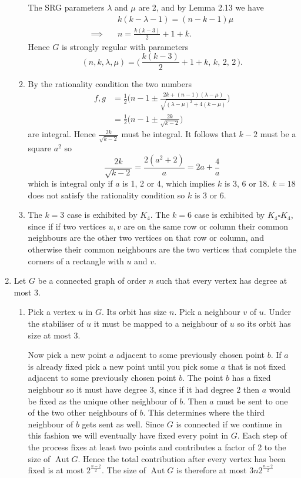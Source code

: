 \documentclass[a4paper, 12pt]{article}
\DeclareMathOperator{\aut}{Aut}
\begin{document}
\begin{enumerate}
\begin{enumerate}
The SRG parameters \(\lambda\) and \(\mu\) are 2, and by Lemma 2.13 we have
\begin{align*}
&k(k-\lambda-1)=(n-k-1)\mu\\
\implies\quad&n=\frac{k(k-3)}2+1+k.
\end{align*}
Hence \(G\) is strongly regular with parameters
\[(n,k,\lambda,\mu)=\bigg(\,\frac{k(k-3)}2+1+k,\,k,\,2,\,2\,\bigg).\]

\item By the rationality condition the two numbers
\begin{align*}
f,g&=\frac12\bigg(n-1\pm\frac{2k+(n-1)(\lambda-\mu)}{\sqrt{(\lambda-\mu)^2+4(k-\mu)}}\bigg)\\
&=\frac12\bigg(n-1\pm\frac{2k}{\sqrt{k-2}}\bigg)
\end{align*}
are integral. Hence \(\frac{2k}{\sqrt{k-2}}\) must be integral. It follows that \(k-2\) must be a square \(a^2\) so
\[\frac{2k}{\sqrt{k-2}}=\frac{2(a^2+2)}{a}=2a+\frac4a\]
which is integral only if \(a\) is 1, 2 or 4, which implies \(k\) is 3, 6 or 18. \(k=18\) does not satisfy the rationality condition so \(k\) is 3 or 6.

\item The \(k=3\) case is exhibited by \(K_4\). The \(k=6\) case is exhibited by \(K_4\square K_4\), since if if two vertices \(u,v\) are on the same row or column their common neighbours are the other two vertices on that row or column, and otherwise their common neighbours are the two vertices that complete the corners of a rectangle with \(u\) and \(v\).

\end{enumerate}

\item Let \(G\) be a connected graph of order \(n\) such that every vertex has degree at most 3.

\begin{enumerate}

\item Pick a vertex \(u\) in \(G\). Its orbit has size \(n\). Pick a neighbour \(v\) of \(u\). Under the stabiliser of \(u\) it must be mapped to a neighbour of \(u\) so its orbit has size at most 3.

Now pick a new point \(a\) adjacent to some previously chosen point \(b\). If \(a\) is already fixed pick a new point until you pick some \(a\) that is not fixed adjacent to some previously chosen point \(b\). The point \(b\) has a fixed neighbour so it must have degree \(3\), since if it had degree \(2\) then \(a\) would be fixed as the unique other neighbour of \(b\). Then \(a\) must be sent to one of the two other neighbours of \(b\). This determines where the third neighbour of \(b\) gets sent as well. Since \(G\) is connected if we continue in this fashion we will eventually have fixed every point in \(G\). Each step of the process fixes at least two points and contributes a factor of 2 to the size of \(\aut G\). Hence the total contribution after every vertex has been fixed is at most \(2^{\frac{n-2}2}\). The size of \(\aut G\) is therefore at most \(3n2^{\frac{n-2}2}\)


\end{enumerate}
\end{enumerate}
\end{document}
